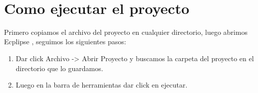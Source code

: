 \begin{figure}[ht!]
 
   \centering
   \hspace{0.1\linewidth}
   \\[20pt]
    
\end{figure}


\section{ Como ejecutar el proyecto}
Primero copiamos el archivo del proyecto en cualquier directorio, luego abrimos Ecplipse , seguimos los siguientes pasos:
\begin{enumerate}
\item Dar click Archivo -> Abrir Proyecto y buscamos la carpeta del proyecto en el directorio que lo guardamos.
\item Luego en la barra de herramientas dar click en ejecutar.
\end{enumerate}
     
